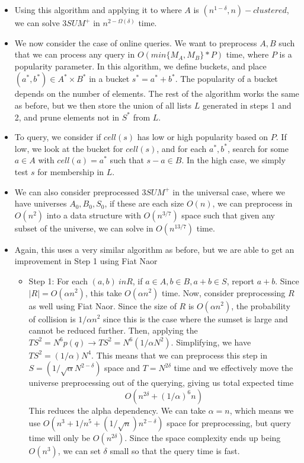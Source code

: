 \documentclass{article}
\begin{document}
\begin{itemize}
    \item Using this algorithm and applying it to where $A$ is $(n^{1-\delta},n)-clustered$, we can solve $3SUM^+$ in $n^{2-\Omega(\delta)}$ time.
    \item We now consider the case of online queries. We want to preprocess $A,B$ such that we can process any query in $O(min\{M_A, M_B\} * P)$ time, where $P$ is a popularity parameter. In this algorithm, we define buckets, and place $(a^*,b^*) \in A^* \times B^*$ in a bucket $s^* = a^* + b^*$. The popularity of a bucket depends on the number of elements. The rest of the algorithm works the same as before, but we then store the union of all lists $L$ generated in steps 1 and 2, and prune elements not in $S^*$ from $L$.
    \item To query, we consider if $cell(s)$ has low or high popularity based on $P$. If low, we look at the bucket for $cell(s)$, and for each $a^*, b^*$, search for some $a \in A$ with $cell(a) = a^*$ such that $s-a \in B$. In the high case, we simply test $s$ for membership in $L$.
    \item We can also consider preprocessed $3SUM^+$ in the universal case, where we have universes $A_0, B_0, S_0$, if these are each size $O(n)$, we can preprocess in $O(n^2)$ into a data structure with $O(n^{3/7})$ space such that given any subset of the universe, we can solve in $O(n^{13/7})$ time.
    \item Again, this uses a very similar algorithm as before, but we are able to get an improvement in Step 1 using Fiat Naor
    \begin{itemize}
        \item Step 1: For each $(a,b) \ in R$, if $a \in A, b\in B, a+b \in S$, report $a+b$. Since $|R| = O(\alpha n^2)$, this take $O(\alpha n^2)$ time. Now, consider preprocessing $R$ as well using Fiat Naor. Since the size of $R$ is $O(\alpha n^2)$, the probability of collision is $1/\alpha n^2$ since this is the case where the sumset is large and cannot be reduced further. Then, applying the $TS^2 = N^6p(q) \rightarrow TS^2 = N^6(1/\alpha N^2)$. Simplifying, we have $TS^2 = (1/\alpha)N^4$. This means that we can preprocess this step in $S = (1/\sqrt{\alpha} N ^{2-\delta})$ space and $T = N^{2\delta}$ time and we effectively move the universe preprocessing out of the querying, giving us total expected time
        $$O(n^{2\delta} + (1/\alpha)^6 n)$$
        This reduces the alpha dependency. We can take $\alpha = n$, which means we use $O(n^3 + 1/n^5 + (1/\sqrt{n})n^{2-\delta})$ space for preprocessing, but query time will only be $O(n^{2\delta})$. Since the space complexity ends up being $O(n^3)$, we can set $\delta$ small so that the query time is fast.
    \end{itemize}
\end{itemize}

\newpage

\end{document}
